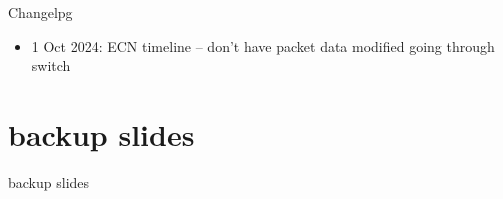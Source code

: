 \date{}
\title{}
\date{}
\usepackage{pgfplots}
\pgfplotsset{compat=1.16}

\begin{frame}
    \titlepage
\end{frame}

{\changelogmode
\begin{frame}{Changelpg}
\begin{itemize}
\item 1 Oct 2024: ECN timeline -- don't have packet data modified going through switch
\end{itemize}
\end{frame}
}





\section{backup slides}
\begin{frame}{backup slides}
\end{frame}


